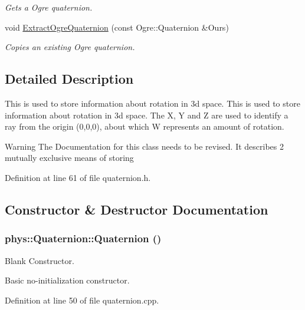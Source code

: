 \begin{DoxyCompactItemize}
\begin{DoxyCompactList}\small\item\em Gets a Ogre quaternion. \item\end{DoxyCompactList}\item 
void \hyperlink{classphys_1_1Quaternion_a942fab675a0b124e1dc5e2febab113e6}{ExtractOgreQuaternion} (const Ogre::Quaternion \&Ours)
\begin{DoxyCompactList}\small\item\em Copies an existing Ogre quaternion. \item\end{DoxyCompactList}\end{DoxyCompactItemize}


\subsection{Detailed Description}
This is used to store information about rotation in 3d space. This is used to store information about rotation in 3d space. The X, Y and Z are used to identify a ray from the origin (0,0,0), about which W represents an amount of rotation. \begin{DoxyWarning}{Warning}
The Documentation for this class needs to be revised. It describes 2 mutually exclusive means of storing 
\end{DoxyWarning}


Definition at line 61 of file quaternion.h.



\subsection{Constructor \& Destructor Documentation}
\hypertarget{classphys_1_1Quaternion_aca4ee6fd6d3967f06cc4a32361fa5a62}{
\subsubsection[{Quaternion}]{\setlength{\rightskip}{0pt plus 5cm}phys::Quaternion::Quaternion ()}}
\label{df/d8c/classphys_1_1Quaternion_aca4ee6fd6d3967f06cc4a32361fa5a62}


Blank Constructor. 

Basic no-\/initialization constructor. 

Definition at line 50 of file quaternion.cpp.

